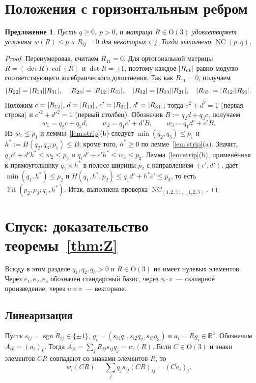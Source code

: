 \documentclass[11pt]{article}
\newtheorem{proposition}[theorem]{Предложение}
\theoremstyle{definition}
\theoremstyle{remark}
\newcommand{\R}{\mathbb{R}}
\newcommand{\Ort}{\mathrm{O}(3)}
\newcommand{\Fit}{\operatorname{Fit}}
\newcommand{\NC}{\operatorname{NC}}
\newcommand{\sgn}{\operatorname{sgn}}
\DeclarePairedDelimiter{\abs}{\lvert}{\rvert}
\begin{document}
\section{Положения с горизонтальным ребром}\label{sec:zero}

\begin{proposition}\label{prop:zero}
Пусть $q\ge0$, $p>0$, и матрица $R\in\Ort$ удовлетворяет условиям $w(R)\le p$ и $R_{ij}=0$ для
некоторых $i,j$. Тогда выполнено $\NC(p,q)$.
\end{proposition}

\begin{proof}
Перенумеровав, считаем $R_{11}=0$. Для ортогональной матрицы $R=(\det R)\operatorname{cof}(R)$ и
$\det R=\pm1$, поэтому каждое $\abs{R_{ab}}$ равно модулю соответствующего алгебраического
дополнения. Так как $R_{11}=0$, получаем
\[
\abs{R_{22}}=\abs{R_{13}}\abs{R_{31}},\quad \abs{R_{23}}=\abs{R_{12}}\abs{R_{31}},\quad
\abs{R_{32}}=\abs{R_{13}}\abs{R_{21}},\quad \abs{R_{33}}=\abs{R_{12}}\abs{R_{21}}.
\]
Положим $c=\abs{R_{12}}$, $d=\abs{R_{13}}$, $c'=\abs{R_{21}}$, $d'=\abs{R_{31}}$; тогда
$c^2+d^2=1$ (первая строка) и $c'^2+d'^2=1$ (первый столбец). Обозначив $B:=q_2d+q_3c$, получаем
\[
w_1=q_2c+q_3d,\qquad w_2=q_1c'+d'B,\qquad w_3=q_1d'+c'B .
\]
Из $w_1\le p_1$ и леммы~\ref{lem:strip}(b) следует $\min(q_2,q_3)\le p_1$ и
$h^*:=H(q_2,q_3;p_1)\le B$; кроме того, $h^*\ge0$ по лемме~\ref{lem:strip}(a). Значит,
$q_1c'+d'h^*\le w_2\le p_2$ и $q_1d'+c'h^*\le w_3\le p_3$. Лемма~\ref{lem:strip}(b), применённая к
прямоугольнику $q_1\times h^*$ в полосе ширины $p_2$ с направлением $(c',d')$, даёт
$\min(q_1,h^*)\le p_2$ и $H(q_1,h^*;p_2)\le q_1d'+h^*c'\le p_3$, то есть $\Fit(p_2,p_3;q_1,h^*)$.
Итак, выполнена проверка $\NC_{(1,2,3),(1,2,3)}$.
\end{proof}

\section{Спуск: доказательство теоремы~\ref{thm:Z}}\label{sec:descent}

Всюду в этом разделе $q_1,q_2,q_3>0$ и $R\in\Ort$ не имеет нулевых элементов. Через $e_1,e_2,e_3$
обозначен стандартный базис, через $u\cdot v$~--- скалярное произведение, через $u\times v$~---
векторное.

\subsection{Линеаризация}
Пусть $s_{ij}=\sgn R_{ij}\in\{\pm1\}$, $g_i=(s_{i1}q_1,s_{i2}q_2,s_{i3}q_3)$ и $a_i=Rg_i\in\R^3$.
Обозначим $A_{ik}=(a_i)_k$. Тогда $A_{ii}=\sum_j R_{ij}s_{ij}q_j=w_i(R)$. Если $C\in\Ort$ и знаки
элементов $CR$ совпадают со знаками элементов $R$, то
\begin{equation}\label{eq:lin}
w_i(CR)=\sum_j q_j s_{ij}(CR)_{ij}=(Ca_i)_i .
\end{equation}
\end{document}
